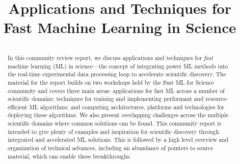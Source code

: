 \documentclass[utf8]{frontiersFPHY}
\begin{document}
\title[Fast Machine Learning in Science]{Applications and Techniques for Fast Machine Learning in Science}

\onecolumn

\author[\firstAuthorLast ]{\Authors} %
\address{} %
\correspondance{} %


\maketitle


\clearpage
\begin{abstract}
\section{}
In this community review report, we discuss applications and techniques for \textit{fast} machine learning (ML) in science---the concept of integrating power ML methods into the real-time experimental data processing loop to accelerate scientific discovery. 
The material for the report builds on two workshops held by the Fast ML for Science community and covers three main areas: applications for fast ML across a number of scientific domains; techniques for training and implementing performant and resource-efficient ML algorithms; and computing architectures, platforms and technologies for deploying these algorithms.  
We also present overlapping challenges across the multiple scientific domains where common solutions can be found.  
This community report is intended to give plenty of examples and inspiration for scientific discovery through integrated and accelerated ML solutions.  
This is followed by a high level overview and organization of technical advances, including an abundance of pointers to source material, which can enable these breakthroughs.  
\tiny
\end{abstract}
\end{document}
